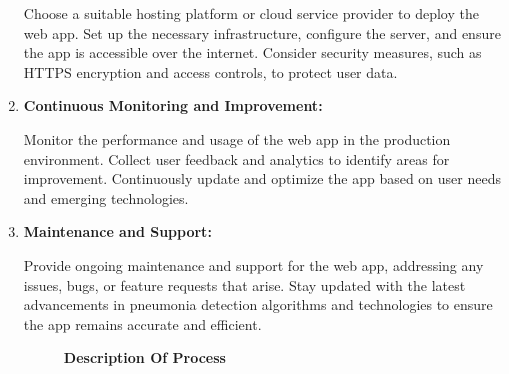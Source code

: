 \begin{enumerate}
	Choose a suitable hosting platform or cloud service provider to deploy the web app. Set up the necessary infrastructure, configure the server, and ensure the app is accessible over the internet. Consider security measures, such as HTTPS encryption and access controls, to protect user data.
	
	\item \textbf {Continuous Monitoring and Improvement:}
	
	Monitor the performance and usage of the web app in the production environment. Collect user feedback and analytics to identify areas for improvement. Continuously update and optimize the app based on user needs and emerging technologies.
	
	\item \textbf {Maintenance and Support:}
	
	Provide ongoing maintenance and support for the web app, addressing any issues, bugs, or feature requests that arise. Stay updated with the latest advancements in pneumonia detection algorithms and technologies to ensure the app remains accurate and efficient.
	
	
	
	\begin{figure}
		\centering
		\caption{\textbf{Description Of Process}}
		\label{fig:Description Of Process}
	\end{figure}
	
	
	
	
	
\end{enumerate}






